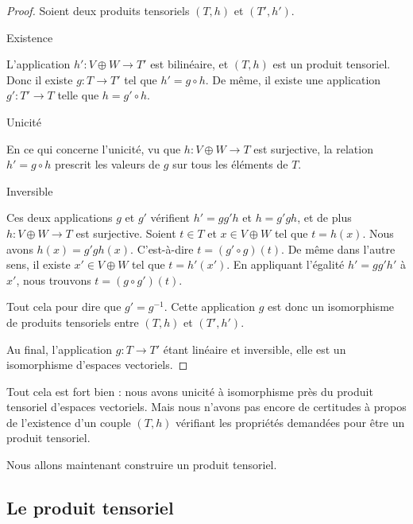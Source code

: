 \begin{proof}
    Soient deux produits tensoriels \( (T,h)\) et \( (T',h')\). 

    \begin{subproof}
        \item[Existence]
    
    L'application \( h'\colon V\oplus W\to T'\) est bilinéaire, et \( (T,h)\) est un produit tensoriel. Donc il existe \( g\colon T\to T'\) tel que \( h'=g\circ h\). De même, il existe une application \( g'\colon T'\to T\) telle que \( h=g'\circ h\).

\item[Unicité]

    En ce qui concerne l'unicité, vu que \( h\colon V\oplus W\to T\) est surjective, la relation \( h'=g\circ h\) prescrit les valeurs de \( g\) sur tous les éléments de \( T\).

\item[Inversible]
    
    Ces deux applications \( g\) et \( g'\) vérifient $h'=gg'h$ et $h=g'gh$, et de plus \( h\colon V\oplus W\to T\) est surjective. Soient \( t\in T\) et \( x\in V\oplus W\) tel que \( t=h(x)\). Nous avons \( h(x)=g'gh(x)\). C'est-à-dire \( t=(g'\circ g)(t)\). De même dans l'autre sens, il existe \( x'\in V\oplus W\) tel que \( t=h'(x')\). En appliquant l'égalité \( h'=gg'h'\) à \( x'\), nous trouvons \( t=(g\circ g')(t)\).

    Tout cela pour dire que \( g'=g^{-1}\). Cette application \( g\) est donc un isomorphisme de produits tensoriels entre \( (T,h)\) et \( (T',h')\).
    \end{subproof}
    Au final, l'application \( g\colon T\to T'\) étant linéaire et inversible, elle est un isomorphisme d'espaces vectoriels.
\end{proof}

Tout cela est fort bien : nous avons unicité à isomorphisme près du produit tensoriel d'espaces vectoriels. Mais nous n'avons pas encore de certitudes à propos de l'existence d'un couple \( (T,h)\) vérifiant les propriétés demandées pour être un produit tensoriel.

Nous allons maintenant construire un produit tensoriel.

\subsection{Le produit tensoriel}

